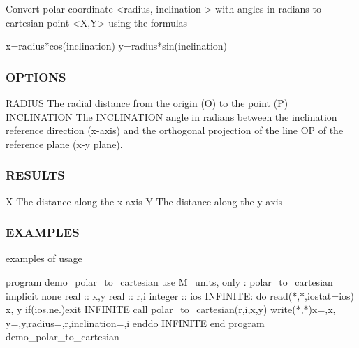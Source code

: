 \begin{DoxyVerb} Convert polar coordinate <radius, inclination > with
 angles in radians to cartesian point <X,Y> using the formulas

   x=radius*cos(inclination)
   y=radius*sin(inclination)
\end{DoxyVerb}


\subsubsection*{O\+P\+T\+I\+O\+NS}

\begin{DoxyVerb}RADIUS       The radial distance from the origin (O) to the point (P)
INCLINATION  The INCLINATION angle in radians between the inclination reference direction
             (x-axis) and the orthogonal projection of the line OP of the
             reference plane (x-y plane).
\end{DoxyVerb}


\subsubsection*{R\+E\+S\+U\+L\+TS}

\begin{DoxyVerb}X  The distance along the x-axis
Y  The distance along the y-axis
\end{DoxyVerb}


\subsubsection*{E\+X\+A\+M\+P\+L\+ES}

examples of usage

program demo\+\_\+polar\+\_\+to\+\_\+cartesian use M\+\_\+units, only \+: polar\+\_\+to\+\_\+cartesian implicit none real \+:\+: x,y real \+:\+: r,i integer \+:\+: ios I\+N\+F\+I\+N\+I\+TE\+: do read($\ast$,$\ast$,iostat=ios) x, y if(ios.\+ne.)exit I\+N\+F\+I\+N\+I\+TE call polar\+\_\+to\+\_\+cartesian(r,i,x,y) write($\ast$,$\ast$)\textquotesingle{}x=\textquotesingle{},x,\textquotesingle{} y=\textquotesingle{},y,\textquotesingle{}radius=\textquotesingle{},r,\textquotesingle{}inclination=\textquotesingle{},i enddo I\+N\+F\+I\+N\+I\+TE end program demo\+\_\+polar\+\_\+to\+\_\+cartesian \mbox{\label{namespacem__units_a2fbd26061a0f20c800791796ce183475}} 
